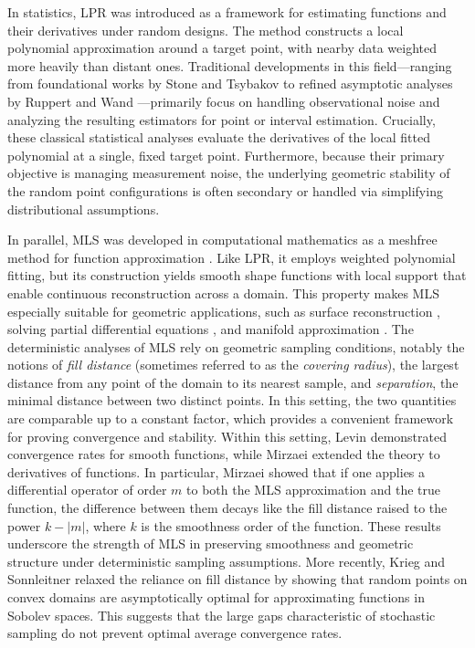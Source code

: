 \documentclass{article}
\begin{document}
In statistics, LPR was introduced as a framework for estimating functions and their derivatives under random designs. The method constructs a local polynomial approximation around a target point, with nearby data weighted more heavily than distant ones. Traditional developments in this field—ranging from foundational works by Stone \cite{stone1982optimal} and Tsybakov \cite{tsybakov2008introduction} to refined asymptotic analyses by Ruppert and Wand \cite{ruppert1994multivariate}—primarily focus on handling observational noise and analyzing the resulting estimators for point or interval estimation. Crucially, these classical statistical analyses evaluate the derivatives of the local fitted polynomial at a single, fixed target point. Furthermore, because their primary objective is managing measurement noise, the underlying geometric stability of the random point configurations is often secondary or handled via simplifying distributional assumptions.

In parallel, MLS was developed in computational mathematics as a meshfree method for function approximation \cite{levin1998approximation}. Like LPR, it employs weighted polynomial fitting, but its construction yields smooth shape functions with local support that enable continuous reconstruction across a domain. This property makes MLS especially suitable for geometric applications, such as surface reconstruction \cite{levin2004mesh}, solving partial differential equations \cite{mirzaei2015analysis}, and manifold approximation \cite{sober2020manifold, sharon2023multiscale}. The deterministic analyses of MLS rely on geometric sampling conditions, notably the notions of \textit{fill distance} (sometimes referred to as the \textit{covering radius}), the largest distance from any point of the domain to its nearest sample, and \textit{separation}, the minimal distance between two distinct points. In this setting, the two quantities are comparable up to a constant factor, which provides a convenient framework for proving convergence and stability. Within this setting, Levin \cite{levin1998approximation} demonstrated convergence rates for smooth functions, while Mirzaei \cite{mirzaei2015analysis} extended the theory to derivatives of functions. In particular, Mirzaei showed that if one applies a differential operator of order $m$ to both the MLS approximation and the true function, the difference between them decays like the fill distance raised to the power $k-|m|$, where $k$ is the smoothness order of the function. These results underscore the strength of MLS in preserving smoothness and geometric structure under deterministic sampling assumptions.
More recently, Krieg and Sonnleitner \cite{krieg2024random} relaxed the reliance on fill distance by showing that random points on convex domains are asymptotically optimal for approximating functions in Sobolev spaces. This suggests that the large gaps characteristic of stochastic sampling do not prevent optimal average convergence rates.
\end{document}
